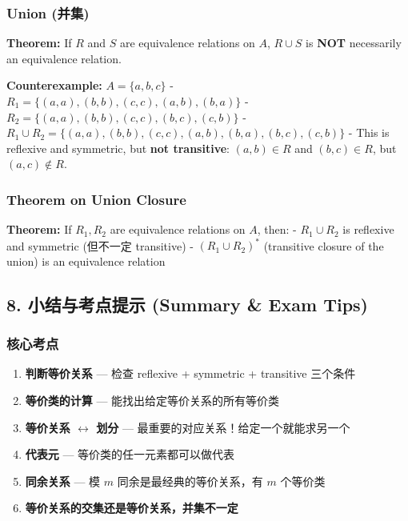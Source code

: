 \documentclass[10pt,a4paper,openany]{ctexbook}
\theoremstyle{definition}
\theoremstyle{remark}
\renewenvironment{quote}
  {\list{}{\leftmargin=1em\rightmargin=0pt\topsep=0.5pt\partopsep=0pt}\item[]}
  {\endlist}
\begin{document}
\subsubsection{Union (并集)}

\begin{quote}
\textbf{Theorem:} If $R$ and $S$ are equivalence relations on $A$, $R \cup S$ is \textbf{NOT} necessarily an equivalence relation.

\textbf{Counterexample:} $A = \{a,b,c\}$
- $R_1 = \{(a,a),(b,b),(c,c),(a,b),(b,a)\}$
- $R_2 = \{(a,a),(b,b),(c,c),(b,c),(c,b)\}$
- $R_1 \cup R_2 = \{(a,a),(b,b),(c,c),(a,b),(b,a),(b,c),(c,b)\}$
- This is reflexive and symmetric, but \textbf{not transitive}: $(a,b) \in R$ and $(b,c) \in R$, but $(a,c) \notin R$.

\end{quote}

\subsubsection{Theorem on Union Closure}

\begin{quote}
\textbf{Theorem:} If $R_1, R_2$ are equivalence relations on $A$, then:
- $R_1 \cup R_2$ is reflexive and symmetric (但不一定 transitive)
- $(R_1 \cup R_2)^*$ (transitive closure of the union) is an equivalence relation

\end{quote}
\vspace{-2pt}

\subsection{8. 小结与考点提示 (Summary \& Exam Tips)}

\subsubsection{核心考点}

\begin{enumerate}
\item \textbf{判断等价关系} — 检查 reflexive + symmetric + transitive 三个条件
\item \textbf{等价类的计算} — 能找出给定等价关系的所有等价类
\item \textbf{等价关系 $\longleftrightarrow$ 划分} — 最重要的对应关系！给定一个就能求另一个
\item \textbf{代表元} — 等价类的任一元素都可以做代表
\item \textbf{同余关系} — 模 $m$ 同余是最经典的等价关系，有 $m$ 个等价类
\item \textbf{等价关系的交集还是等价关系，并集不一定}

\end{enumerate}
\end{document}

